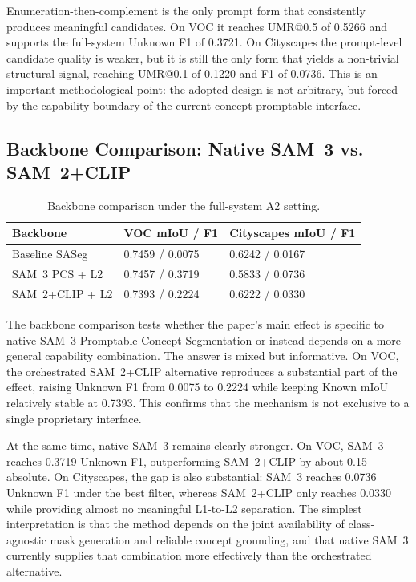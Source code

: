 \documentclass[a4paper,fleqn]{cas-dc}
\newcommand{\samthree}{SAM~3}
\newcommand{\samtwo}{SAM~2}
\newcommand{\clip}{CLIP}
\begin{document}
Enumeration-then-complement is the only prompt form that consistently produces meaningful candidates. On VOC it reaches UMR@0.5 of 0.5266 and supports the full-system Unknown F1 of 0.3721. On Cityscapes the prompt-level candidate quality is weaker, but it is still the only form that yields a non-trivial structural signal, reaching UMR@0.1 of 0.1220 and F1 of 0.0736. This is an important methodological point: the adopted design is not arbitrary, but forced by the capability boundary of the current concept-promptable interface.

\subsection{Backbone Comparison: Native \samthree{} vs. \samtwo{}+\clip{}}
\label{sec:exp:backbone}

\begin{table}[!htbp]
  \caption{Backbone comparison under the full-system A2 setting.}
  \label{tab:backbone}
  \centering
  \begin{tabular}{lll}
    \toprule
    Backbone & VOC mIoU / F1 & Cityscapes mIoU / F1 \\
    \midrule
    Baseline SASeg & 0.7459 / 0.0075 & 0.6242 / 0.0167 \\
    \samthree{} PCS + L2 & 0.7457 / 0.3719 & 0.5833 / 0.0736 \\
    \samtwo{}+\clip{} + L2 & 0.7393 / 0.2224 & 0.6222 / 0.0330 \\
    \bottomrule
  \end{tabular}
\end{table}

The backbone comparison tests whether the paper's main effect is specific to native \samthree{} Promptable Concept Segmentation or instead depends on a more general capability combination. The answer is mixed but informative. On VOC, the orchestrated \samtwo{}+\clip{} alternative reproduces a substantial part of the effect, raising Unknown F1 from 0.0075 to 0.2224 while keeping Known mIoU relatively stable at 0.7393. This confirms that the mechanism is not exclusive to a single proprietary interface.

At the same time, native \samthree{} remains clearly stronger. On VOC, \samthree{} reaches 0.3719 Unknown F1, outperforming \samtwo{}+\clip{} by about 0.15 absolute. On Cityscapes, the gap is also substantial: \samthree{} reaches 0.0736 Unknown F1 under the best filter, whereas \samtwo{}+\clip{} only reaches 0.0330 while providing almost no meaningful L1-to-L2 separation. The simplest interpretation is that the method depends on the joint availability of class-agnostic mask generation and reliable concept grounding, and that native \samthree{} currently supplies that combination more effectively than the orchestrated alternative.
\end{document}
